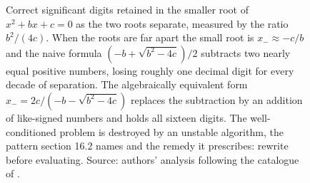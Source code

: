 \begin{figure}[ht]
\centering
{}
\caption[Catastrophic cancellation in the quadratic formula]{Correct
significant digits retained in the smaller root of $x^{2} + b x + c = 0$
as the two roots separate, measured by the ratio $b^{2}/(4c)$. When the
roots are far apart the small root is $x_{-} \approx -c/b$ and the naive
formula $(-b + \sqrt{b^{2} - 4c})/2$ subtracts two nearly equal
positive numbers, losing roughly one decimal digit for every decade of
separation. The algebraically equivalent form $x_{-} = 2c/(-b -
\sqrt{b^{2} - 4c})$ replaces the subtraction by an addition of
like-signed numbers and holds all sixteen digits. The well-conditioned
problem is destroyed by an unstable algorithm, the pattern section 16.2
names and the remedy it prescribes: rewrite before evaluating. Source:
authors' analysis following the catalogue of
\cite{text:goldberg1991-floating-point}.}
\label{fig:vol02ch16:quadratic-cancellation}
\end{figure}
